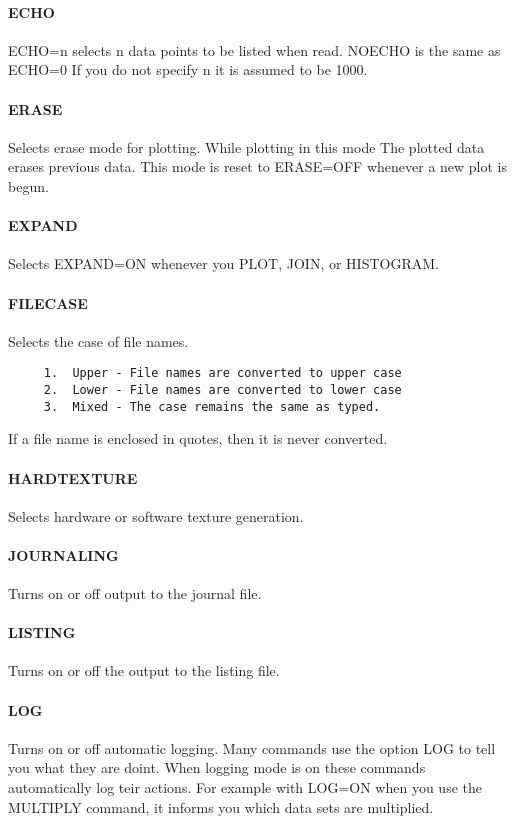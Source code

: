\paragraph{ECHO}
ECHO=n selects n data points to be listed when read.  NOECHO is the
same as ECHO=0 If you do not specify n it is assumed to be 1000.  
\paragraph{ERASE}
Selects erase mode for plotting.  While plotting in this mode The
plotted data erases previous data.  This mode is reset to ERASE=OFF
whenever a new plot is begun.  
\paragraph{EXPAND}
Selects EXPAND=ON whenever you PLOT, JOIN, or HISTOGRAM.  
\paragraph{FILECASE}
Selects the case of file names.  
\begin{verbatim}
     1.  Upper - File names are converted to upper case 
     2.  Lower - File names are converted to lower case 
     3.  Mixed - The case remains the same as typed.  
\end{verbatim}

If a file name is enclosed in quotes, then it is never converted.  
\paragraph{HARDTEXTURE}
Selects hardware or software texture generation.  
\paragraph{JOURNALING}
Turns on or off output to the journal file.  
\paragraph{LISTING}
Turns on or off the output to the listing file.  
\paragraph{LOG}
Turns on or off automatic logging.  Many commands use the option LOG
to tell you what they are doint.  When logging mode is on these
commands automatically log teir actions.  For example with LOG=ON
when you use the MULTIPLY command, it informs you which data sets are
multiplied.  
